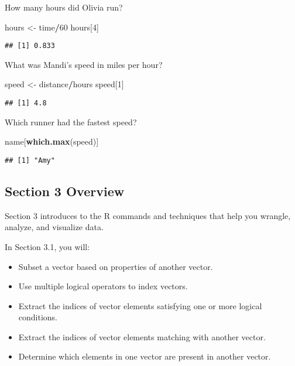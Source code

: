 \documentclass[
]{article}
\newenvironment{Shaded}{\begin{snugshade}}{\end{snugshade}}
\newcommand{\DecValTok}[1]{\textcolor[rgb]{0.00,0.00,0.81}{#1}}
\newcommand{\KeywordTok}[1]{\textcolor[rgb]{0.13,0.29,0.53}{\textbf{#1}}}
\newcommand{\NormalTok}[1]{#1}
\newcommand{\OperatorTok}[1]{\textcolor[rgb]{0.81,0.36,0.00}{\textbf{#1}}}
\newcommand{\StringTok}[1]{\textcolor[rgb]{0.31,0.60,0.02}{#1}}
\providecommand{\tightlist}{%
  \setlength{\itemsep}{0pt}\setlength{\parskip}{0pt}}
\begin{document}
How many hours did Olivia run?

\begin{Shaded}
\begin{Highlighting}[]
\NormalTok{hours <-}\StringTok{ }\NormalTok{time}\OperatorTok{/}\DecValTok{60}
\NormalTok{hours[}\DecValTok{4}\NormalTok{]}
\end{Highlighting}
\end{Shaded}

\begin{verbatim}
## [1] 0.833
\end{verbatim}

What was Mandi's speed in miles per hour?

\begin{Shaded}
\begin{Highlighting}[]
\NormalTok{speed <-}\StringTok{ }\NormalTok{distance}\OperatorTok{/}\NormalTok{hours}
\NormalTok{speed[}\DecValTok{1}\NormalTok{]}
\end{Highlighting}
\end{Shaded}

\begin{verbatim}
## [1] 4.8
\end{verbatim}

Which runner had the fastest speed?

\begin{Shaded}
\begin{Highlighting}[]
\NormalTok{name[}\KeywordTok{which.max}\NormalTok{(speed)]}
\end{Highlighting}
\end{Shaded}

\begin{verbatim}
## [1] "Amy"
\end{verbatim}

\hypertarget{section-3-overview}{%
\subsection{Section 3 Overview}\label{section-3-overview}}

Section 3 introduces to the R commands and techniques that help you
wrangle, analyze, and visualize data.

In Section 3.1, you will:

\begin{itemize}
\tightlist
\item
  Subset a vector based on properties of another vector.
\item
  Use multiple logical operators to index vectors.
\item
  Extract the indices of vector elements satisfying one or more logical
  conditions.
\item
  Extract the indices of vector elements matching with another vector.
\item
  Determine which elements in one vector are present in another vector.
\end{itemize}
\end{document}
